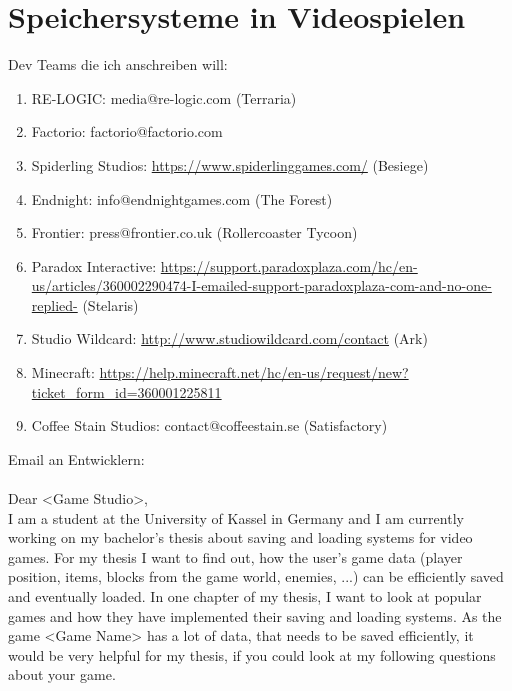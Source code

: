 \chapter{Speichersysteme in Videospielen}\label{ch:videospiele}
Dev Teams die ich anschreiben will:
\begin{enumerate}
    \item RE-LOGIC: media@re-logic.com (Terraria)
    \item Factorio: factorio@factorio.com
    \item Spiderling Studios: \url{https://www.spiderlinggames.com/} (Besiege)
    \item Endnight: info@endnightgames.com (The Forest)
    \item Frontier: press@frontier.co.uk (Rollercoaster Tycoon)
    \item Paradox Interactive: \url{https://support.paradoxplaza.com/hc/en-us/articles/360002290474-I-emailed-support-paradoxplaza-com-and-no-one-replied-} (Stelaris)
    \item Studio Wildcard: \url{http://www.studiowildcard.com/contact} (Ark)
    \item Minecraft: \url{https://help.minecraft.net/hc/en-us/request/new?ticket_form_id=360001225811}
    \item Coffee Stain Studios: contact@coffeestain.se (Satisfactory)
\end{enumerate}


Email an Entwicklern:\\
\\
Dear <Game Studio>,\\
I am a student at the University of Kassel in Germany and I am currently working on my bachelor's thesis about saving and loading systems for video games. For my thesis I want to find out, how the user's game data (player position, items, blocks from the game world, enemies, ...) can be efficiently saved and eventually loaded. In one chapter of my thesis, I want to look at popular games and how they have implemented their saving and loading systems. As the game <Game Name> has a lot of data, that needs to be saved efficiently, it would be very helpful for my thesis, if you could look at my following questions about your game.

